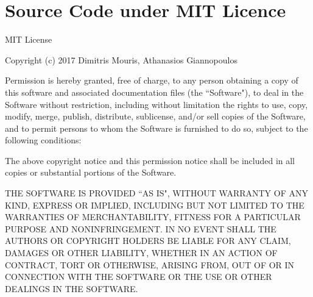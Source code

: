 \chapter{Source Code under MIT Licence}\label{AppendixA}

MIT License

Copyright (c) 2017 Dimitris Mouris, Athanasios Giannopoulos

Permission is hereby granted, free of charge, to any person obtaining a copy
of this software and associated documentation files (the ``Software"), to deal
in the Software without restriction, including without limitation the rights
to use, copy, modify, merge, publish, distribute, sublicense, and/or sell
copies of the Software, and to permit persons to whom the Software is
furnished to do so, subject to the following conditions:

The above copyright notice and this permission notice shall be included in all
copies or substantial portions of the Software.

THE SOFTWARE IS PROVIDED ``AS IS", WITHOUT WARRANTY OF ANY KIND, EXPRESS OR
IMPLIED, INCLUDING BUT NOT LIMITED TO THE WARRANTIES OF MERCHANTABILITY,
FITNESS FOR A PARTICULAR PURPOSE AND NONINFRINGEMENT. IN NO EVENT SHALL THE
AUTHORS OR COPYRIGHT HOLDERS BE LIABLE FOR ANY CLAIM, DAMAGES OR OTHER
LIABILITY, WHETHER IN AN ACTION OF CONTRACT, TORT OR OTHERWISE, ARISING FROM,
OUT OF OR IN CONNECTION WITH THE SOFTWARE OR THE USE OR OTHER DEALINGS IN THE
SOFTWARE.
